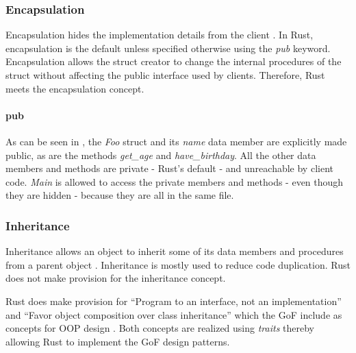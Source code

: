 
\addtocounter{footnote}{1}
\addtocounter{footnote}{1}

\subsubsection{Encapsulation}
Encapsulation hides the implementation details from the client \cite{klabnik_2019_01,meyer_97_01,savitch_15_01}.
In Rust, encapsulation is the default unless specified otherwise using the \textit{pub} keyword.
Encapsulation allows the struct creator to change the internal procedures of the struct without affecting the public interface used by clients.
Therefore, Rust meets the encapsulation concept.

\paragraph{pub}
As can be seen in , the \textit{Foo} struct and its \textit{name} data member are explicitly made public, as are the methods \textit{get\_age} and \textit{have\_birthday}.
All the other data members and methods are private - Rust's default - and unreachable by client code.
\textit{Main} is allowed to access the private members and methods - even though they are hidden - because they are all in the same file.

\subsubsection{Inheritance}
Inheritance allows an object to inherit some of its data members and procedures from a parent object \cite{meyer_97_01,stefik_85_01,gamma_94_01,savitch_15_01}.
Inheritance is mostly used to reduce code duplication.
Rust does not make provision for the inheritance concept.

Rust does make provision for ``Program to an interface, not an implementation'' and ``Favor object composition over class inheritance'' which the GoF include as concepts for OOP design \cite{gamma_94_01}.
Both concepts are realized using \textit{traits} thereby allowing Rust to implement the GoF design patterns.

